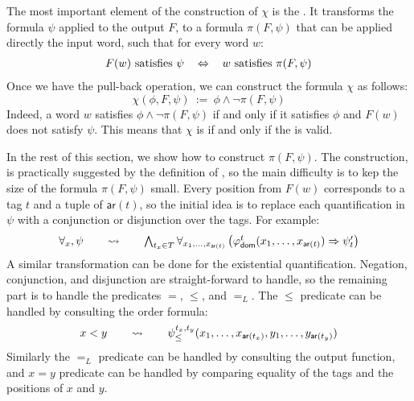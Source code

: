 The most important element of the construction of $\chi$ is the .
It transforms the formula $\psi$ applied to the output $F$,
to a formula $\pi(F, \psi)$ that can be applied directly the input word, 
such that for every word $w$:
\[
\begin{tabular}{ccc}
    $F(w)$ satisfies $\psi$ & $\Leftrightarrow$ & $w$ satisfies $\pi(F, \psi)$
\end{tabular}
\]
Once we have the pull-back operation, we can construct the formula $\chi$ as follows:
\[ 
    \chi(\phi, F, \psi)\ :=\ \phi \wedge \neg \pi(F, \psi)
\]
Indeed, a word $w$ satisfies $\phi \wedge \neg \pi(F, \psi)$ if and only if
it satisfies $\phi$ and $F(w)$ does not satisfy $\psi$. This means that 
$\chi$ is  if and only if the  is valid.

In the rest of this section, we show how to construct $\pi(F, \psi)$. 
The construction, is practically suggested by the definition of
, so the main difficulty 
is to kep the size of the formula $\pi(F, \psi)$ small.
Every position from $F(w)$ corresponds to a tag $t$ and a tuple of $\mathsf{ar}(t)$, 
so the initial idea is to replace each quantification in $\psi$ with a conjunction or disjunction
over the tags. For example: 
\[ 
\begin{tabular}{ccc}
    $\forall_{x}, \psi$ & $\quad \rightsquigarrow \quad$ & $\bigwedge_{t_x \in T} \forall_{x_1, \ldots, x_{\mathsf{ar}(t)}} \left( \varphi_{\mathsf{dom}}^t(x_1, \ldots, x_{\mathsf{ar}(t)}) \Rightarrow \psi'_{t} \right)$
\end{tabular}
\]
A similar transformation can be done for the existential quantification. Negation, conjunction, and disjunction are straight-forward to handle, so 
the remaining part is to handle the predicates $=$, $\leq$, and $=_L$. The $\leq$ predicate can be handled by consulting the order formula:
\[
\begin{tabular}{ccc}
    $x < y$ & $\quad \rightsquigarrow \quad$ & $\psi_{\leq}^{t_x, t_y}(x_1, \ldots, x_{\mathsf{ar}(t_x)}, y_1, \ldots, y_{\mathsf{ar}(t_y)})$
\end{tabular}
\]
Similarly the $=_L$ predicate can be handled by consulting the output function, and
$x = y$ predicate can be handled by comparing equality of the tags and the positions of $x$ and $y$. 

